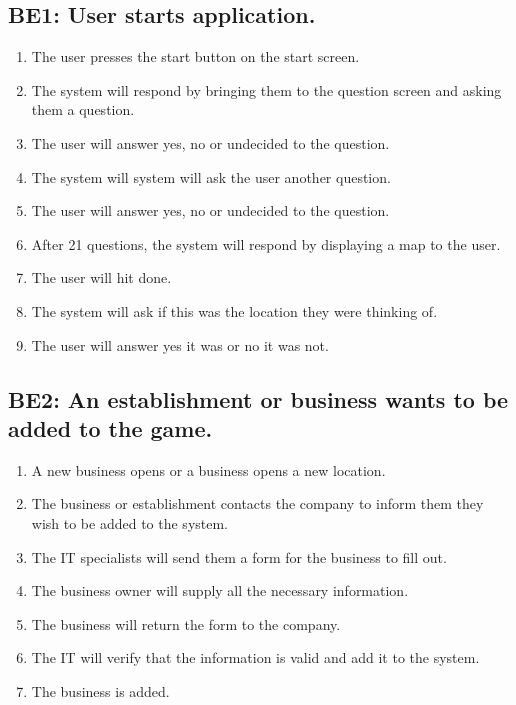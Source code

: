 \documentclass[]{article}
\begin{document}
\subsection{BE1: User starts application.}
\label{sub: BE1: User starts application.}
\begin{enumerate}[{BE1}.1]
		\item	The user presses the start button on the start screen.
		\item The system will respond by bringing them to the question screen and asking them a question.
		\item The user will answer yes, no or undecided to the question.
		\item The system will system will ask the user another question.
		\item The user will answer yes, no or undecided to the question.
		\item After 21 questions, the system will respond by displaying a map to the user.
		\item The user will hit done.
		\item The system will ask if this was the location they were thinking of.
		\item The user will answer yes it was or no it was not.
\end{enumerate}


\subsection{BE2: An establishment or business wants to be added to the game.}
\label{sub: BE2:  An establishment or business wants to be added to the game.}
\begin{enumerate}[{BE2}.1]
	\item A new business opens or a business opens a new location.
	\item The business or establishment contacts the company to inform them they wish to be added to the system.
	\item The IT specialists will send them a form for the business to fill out.
	\item The business owner will supply all the necessary information.
	\item The business will return the form to the company.
	\item The IT will verify that the information is valid and add it to the system.
	\item The business is added.
\end{enumerate}
\end{document}
